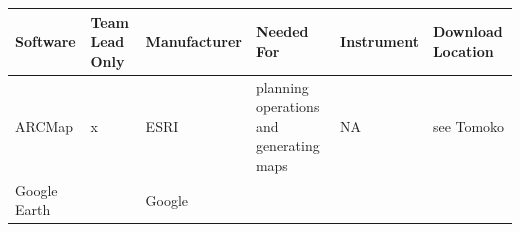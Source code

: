 \documentclass[]{book}
\begin{document}
\begin{longtable}[]{@{}llllll@{}}
\toprule
\begin{minipage}[b]{0.14\columnwidth}\raggedright
Software\strut
\end{minipage} & \begin{minipage}[b]{0.06\columnwidth}\raggedright
Team Lead Only\strut
\end{minipage} & \begin{minipage}[b]{0.07\columnwidth}\raggedright
Manufacturer\strut
\end{minipage} & \begin{minipage}[b]{0.18\columnwidth}\raggedright
Needed For\strut
\end{minipage} & \begin{minipage}[b]{0.08\columnwidth}\raggedright
Instrument\strut
\end{minipage} & \begin{minipage}[b]{0.30\columnwidth}\raggedright
Download Location\strut
\end{minipage}\tabularnewline
\midrule
\endhead
\begin{minipage}[t]{0.14\columnwidth}\raggedright
ARCMap\strut
\end{minipage} & \begin{minipage}[t]{0.06\columnwidth}\raggedright
x\strut
\end{minipage} & \begin{minipage}[t]{0.07\columnwidth}\raggedright
ESRI\strut
\end{minipage} & \begin{minipage}[t]{0.18\columnwidth}\raggedright
planning operations and generating maps\strut
\end{minipage} & \begin{minipage}[t]{0.08\columnwidth}\raggedright
NA\strut
\end{minipage} & \begin{minipage}[t]{0.30\columnwidth}\raggedright
see Tomoko\strut
\end{minipage}\tabularnewline
\begin{minipage}[t]{0.14\columnwidth}\raggedright
Google Earth\strut
\end{minipage} & \begin{minipage}[t]{0.06\columnwidth}\raggedright
\strut
\end{minipage} & \begin{minipage}[t]{0.07\columnwidth}\raggedright
Google\strut
\end{minipage} & \begin{minipage}[t]{0.18\columnwidth}\raggedright

\end{minipage}
\end{longtable}
\end{document}
